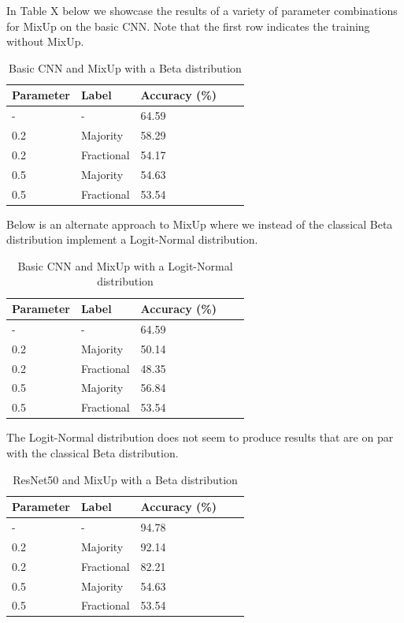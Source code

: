 \documentclass{article}
\begin{document}
In Table X below we showcase the results of a variety of parameter combinations for MixUp on the basic CNN. Note that the first row indicates the training without MixUp.
\begin{table}[H]
	\caption{Basic CNN and MixUp with a Beta distribution}
	\label{sample-table}
	\centering
	\begin{tabular}{lllll}
		\toprule
		Parameter & Label & Accuracy (\%) \\
		\midrule
		 - & - & 64.59  \\
		 0.2 & Majority & 58.29 \\
		 0.2 & Fractional & 54.17 \\ 
		 0.5 & Majority & 54.63 \\
		 0.5 & Fractional & 53.54 \\
		\bottomrule
	\end{tabular}
\end{table}

Below is an alternate approach to MixUp where we instead of the classical Beta distribution implement a Logit-Normal distribution.

\begin{table}[H]
	\caption{Basic CNN and MixUp with a Logit-Normal distribution}
	\label{sample-table}
	\centering
	\begin{tabular}{lllll}
		\toprule
		Parameter & Label & Accuracy (\%) \\
		\midrule
		 - & - & 64.59  \\
		 0.2 & Majority & 50.14 \\
		 0.2 & Fractional & 48.35 \\ 
		 0.5 & Majority & 56.84 \\
		 0.5 & Fractional & 53.54 \\
		\bottomrule
	\end{tabular}
\end{table}

The Logit-Normal distribution does not seem to produce results that are on par with the classical Beta distribution.

\begin{table}[H]
	\caption{ResNet50 and MixUp with a Beta distribution}
	\label{sample-table}
	\centering
	\begin{tabular}{lllll}
		\toprule
		Parameter & Label & Accuracy (\%) \\
		\midrule
		 - & - & 94.78  \\
		 0.2 & Majority & 92.14 \\
		 0.2 & Fractional & 82.21 \\ 
		 0.5 & Majority & 54.63 \\
		 0.5 & Fractional & 53.54 \\
		\bottomrule
	\end{tabular}
\end{table}
\end{document}
